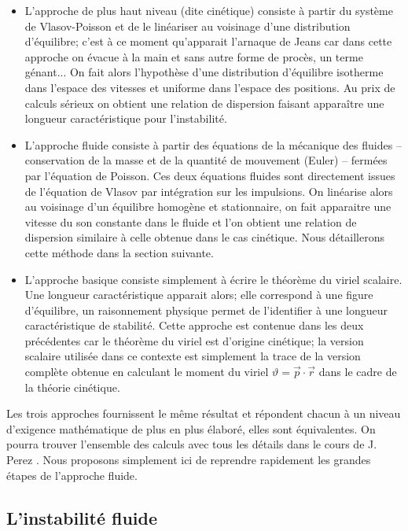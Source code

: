 \begin{itemize}
\item L'approche de plus haut niveau (dite cinétique) consiste à partir du système de Vlasov-Poisson et de le linéariser au voisinage d'une distribution d'équilibre; c'est à ce moment qu'apparait l'arnaque de Jeans car dans cette approche on évacue \og à la main \fg et sans autre forme de procès, un terme génant... On fait alors l'hypothèse d'une distribution d'équilibre isotherme dans l'espace des vitesses et uniforme dans l'espace des positions. Au prix de calculs sérieux on obtient une relation de dispersion faisant apparaître une longueur caractéristique pour l'instabilité.

\item L'approche fluide consiste à partir des équations de la mécanique des fluides  -- conservation de la masse et de la quantité de mouvement (Euler) -- fermées par l'équation de Poisson. Ces deux équations fluides sont directement issues de l'équation de Vlasov par intégration sur les impulsions. On linéarise alors au voisinage d'un équilibre  homogène et stationnaire, on fait apparaitre une vitesse du son constante dans le fluide et l'on obtient une relation de dispersion similaire à celle obtenue dans le cas cinétique. Nous détaillerons cette méthode dans la section suivante.

\item L'approche basique consiste simplement à écrire le théorème du viriel scalaire. Une longueur caractéristique apparait alors; elle correspond  à une figure d'équilibre, un raisonnement physique permet de l'identifier à une longueur caractéristique de stabilité.
Cette approche est contenue dans les deux précédentes car le théorème du viriel est d'origine cinétique; la version scalaire utilisée dans ce contexte est simplement la trace de la version complète obtenue en calculant le moment du viriel $\vartheta=\vec p \cdot \vec r$ dans le cadre de la théorie cinétique.
\end{itemize}

Les trois approches fournissent le même résultat et répondent chacun à un niveau d'exigence mathématique de plus en plus élaboré, elles sont équivalentes. On pourra trouver l'ensemble des calculs avec tous les détails dans le cours de J. Perez \cite{CoursJP}. Nous proposons simplement ici de reprendre rapidement les grandes étapes de l'approche fluide.

\subsection{L'instabilité fluide}

